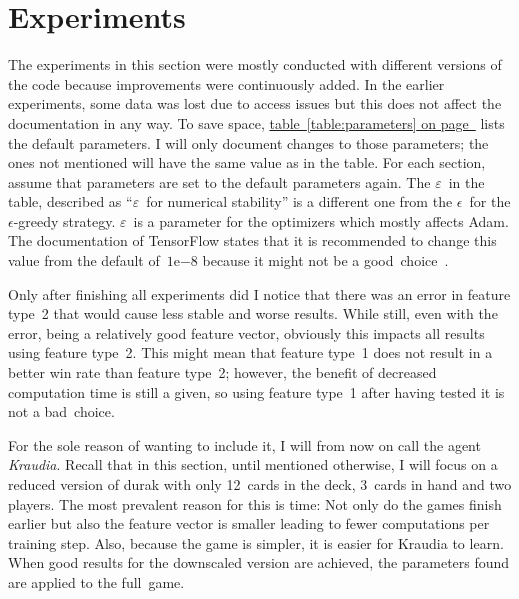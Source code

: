 \documentclass[a4paper,titlepage]{article}
\newcommand{\expn}[2]{{#1}\mathrm{e}{#2}}
\begin{document}
\newpage

\section{Experiments}
\label{sec:experiments}

The experiments in this section were mostly conducted with different versions of the code because improvements were continuously added. In the earlier experiments, some data was lost due to access issues but this does not affect the documentation in any way.
To save space, \hyperref[table:parameters]{table~\ref*{table:parameters} on page~\pageref*{table:parameters}} lists the default parameters.
I will only document changes to those parameters; the ones not mentioned will have the same value as in the table. For each section, assume that parameters are set to the default parameters again. The $\varepsilon$~in the table, described as ``$\varepsilon$~for numerical stability'' is a different one from the $\epsilon$~for the $\epsilon$-greedy strategy. $\varepsilon$~is a parameter for the optimizers which mostly affects Adam. The documentation of TensorFlow states that it is recommended to change this value from the default of~$\expn{1}{-8}$ because it might not be a good~choice~\cite{tfadam}.

Only after finishing all experiments did I notice that there was an error in feature type~2 that would cause less stable and worse results. While still, even with the error, being a relatively good feature vector, obviously this impacts all results using feature type~2. This might mean that feature type~1 does not result in a better win rate than feature type~2; however, the benefit of decreased computation time is still a given, so using feature type~1 after having tested it is not a bad~choice.

For the sole reason of wanting to include it, I will from now on call the agent \emph{Kraudia}.
Recall that in this section, until mentioned otherwise, I will focus on a reduced version of durak with only 12~cards in the deck, 3~cards in hand and two players. The most prevalent reason for this is time: Not only do the games finish earlier but also the feature vector is smaller leading to fewer computations per training step.
Also, because the game is simpler, it is easier for Kraudia to learn. When good results for the downscaled version are achieved, the parameters found are applied to the full~game.
\end{document}
